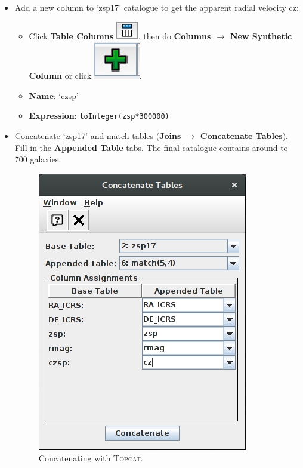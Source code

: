 \documentclass [a4paper, 12pt]{article}
\newcommand{\topcat}{{\textsc{Topcat}}}
\begin{document}
\begin{itemize}
\item Add a new column to `zsp17' catalogue to get the apparent radial velocity 
cz:
\begin{itemize}
    \item Click \textbf{Table Columns}  \includegraphics[width=0.04  
    \textwidth]{../images/topcat_button_metadata.jpg}, then do \textbf{Columns 
        $\rightarrow$ New Synthetic Column} or click  
        \includegraphics[width=0.04  
    \textwidth]{../images/topcat_button_add.jpg}.
    \item \textbf{Name}: `czsp'
    \item \textbf{Expression}: \texttt{toInteger(zsp*300000)}
\end{itemize}
\item Concatenate `zsp17' and match tables (\textbf{Joins $\rightarrow$ 
Concatenate Tables}). Fill in the \textbf{Appended Table} tabs. The final 
catalogue contains around to 700 galaxies.
\begin{figure}[H]
\center
\includegraphics[width=0.3  
\textwidth]{../images/topcat_concatenate_SDSS_Rines2003.png}
\caption{Concatenating with \topcat.}
\label{fig:topcatconcat}
\end{figure}
\end{itemize}
\end{document}
